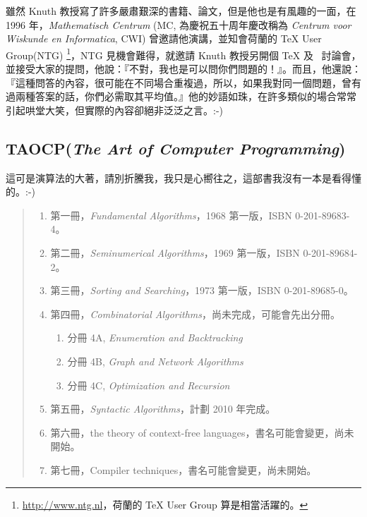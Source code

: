 雖然 Knuth 教授寫了許多嚴肅艱深的書籍、論文，但是他也是有風趣的一面，在 1996 年，\textit{Mathematisch Centrum }(MC, 為慶祝五十周年慶改稱為 \textit{Centrum voor Wiskunde en Informatica}, CWI) 曾邀請他演講，並知會荷蘭的 \TeX{} User Group(NTG)%
\footnote{\url{http://www.ntg.nl}，荷蘭的 \TeX{} User Group 算是相當活躍的。}，NTG 見機會難得，就邀請 Knuth 教授另開個 \TeX{} 及 \MF\ 討論會，並接受大家的提問，他說：『不對，我也是可以問你們問題的！』。而且，他還說：『這種問答的內容，很可能在不同場合重複過，所以，如果我對同一個問題，曾有過兩種答案的話，你們必需取其平均值。』他的妙語如珠，在許多類似的場合常常引起哄堂大笑，但實際的內容卻絕非泛泛之言。:-)

\subsection{TAOCP(\textit{The Art of Computer Programming})}

這可是演算法的大著，請別折騰我，我只是心嚮往之，這部書我沒有一本是看得懂的。:-)

\begin{quote}
  \begin{enumerate}
    \item 第一冊，{\em Fundamental Algorithms}，1968 第一版，ISBN 0-201-89683-4。
    \item 第二冊，{\em Seminumerical Algorithms}，1969 第一版，ISBN 0-201-89684-2。
    \item 第三冊，{\em Sorting and Searching}，1973 第一版，ISBN 0-201-89685-0。
    \item 第四冊，{\em Combinatorial Algorithms}，尚未完成，可能會先出分冊。
      \begin{enumerate}
        \item 分冊 4A, {\em Enumeration and Backtracking}
        \item 分冊 4B, {\em Graph and Network Algorithms}
        \item 分冊 4C, {\em Optimization and Recursion}
      \end{enumerate}
    \item 第五冊，{\em Syntactic Algorithms}，計劃 2010 年完成。
    \item 第六冊，the theory of context-free languages，書名可能會變更，尚未開始。
    \item 第七冊，Compiler techniques，書名可能會變更，尚未開始。
  \end{enumerate}
\end{quote}

